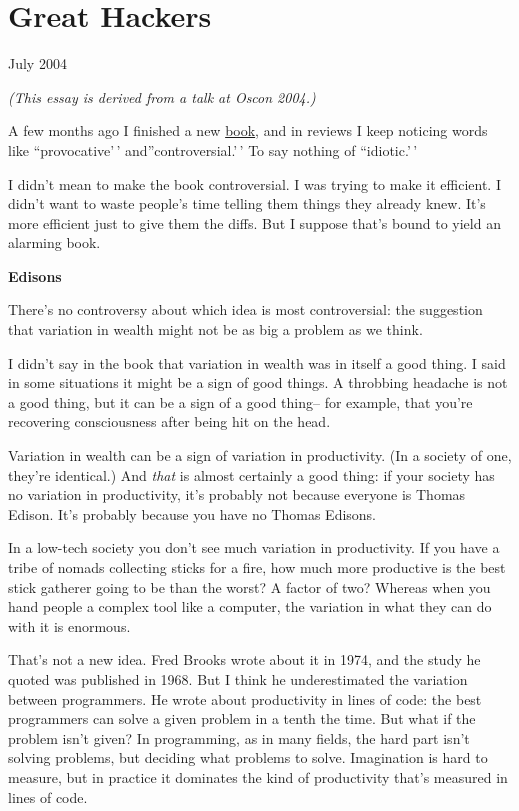 \chapter{Great Hackers}

July 2004

\emph{(This essay is derived from a talk at Oscon 2004.)}

A few months ago I finished a new
\href{http://www.amazon.com/exec/obidos/tg/detail/-/0596006624}{book},
and in reviews I keep noticing words like ``provocative'\,'
and''controversial.'\,' To say nothing of ``idiotic.'\,'

I didn't mean to make the book controversial. I was trying to make it
efficient. I didn't want to waste people's time telling them things they
already knew. It's more efficient just to give them the diffs. But I
suppose that's bound to yield an alarming book.

\textbf{Edisons}

There's no controversy about which idea is most controversial: the
suggestion that variation in wealth might not be as big a problem as we
think.

I didn't say in the book that variation in wealth was in itself a good
thing. I said in some situations it might be a sign of good things. A
throbbing headache is not a good thing, but it can be a sign of a good
thing-- for example, that you're recovering consciousness after being
hit on the head.

Variation in wealth can be a sign of variation in productivity. (In a
society of one, they're identical.) And \emph{that} is almost certainly
a good thing: if your society has no variation in productivity, it's
probably not because everyone is Thomas Edison. It's probably because
you have no Thomas Edisons.

In a low-tech society you don't see much variation in productivity. If
you have a tribe of nomads collecting sticks for a fire, how much more
productive is the best stick gatherer going to be than the worst? A
factor of two? Whereas when you hand people a complex tool like a
computer, the variation in what they can do with it is enormous.

That's not a new idea. Fred Brooks wrote about it in 1974, and the study
he quoted was published in 1968. But I think he underestimated the
variation between programmers. He wrote about productivity in lines of
code: the best programmers can solve a given problem in a tenth the
time. But what if the problem isn't given? In programming, as in many
fields, the hard part isn't solving problems, but deciding what problems
to solve. Imagination is hard to measure, but in practice it dominates
the kind of productivity that's measured in lines of code.

